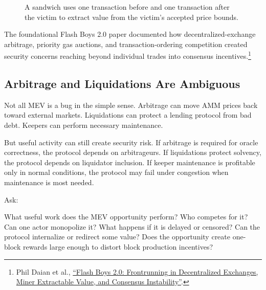 \begin{figure}[htbp]
\centering
{}
\caption{A sandwich uses one transaction before and one transaction after the victim to extract value from the victim's accepted price bounds.}
\end{figure}

The foundational Flash Boys 2.0 paper documented how decentralized-exchange arbitrage, priority gas auctions, and transaction-ordering competition created security concerns reaching beyond individual trades into consensus incentives.\footnote{Phil Daian et al., \href{https://arxiv.org/abs/1904.05234}{``Flash Boys 2.0: Frontrunning in Decentralized Exchanges, Miner Extractable Value, and Consensus Instability''}.}

\subsection{Arbitrage and Liquidations Are Ambiguous}

Not all MEV is a bug in the simple sense. Arbitrage can move AMM prices back toward external markets. Liquidations can protect a lending protocol from bad debt. Keepers can perform necessary maintenance.

But useful activity can still create security risk. If arbitrage is required for oracle correctness, the protocol depends on arbitrageurs. If liquidations protect solvency, the protocol depends on liquidator inclusion. If keeper maintenance is profitable only in normal conditions, the protocol may fail under congestion when maintenance is most needed.

Ask:

\begin{codeblock}
What useful work does the MEV opportunity perform?
Who competes for it?
Can one actor monopolize it?
What happens if it is delayed or censored?
Can the protocol internalize or redirect some value?
Does the opportunity create one-block rewards large enough to distort
block production incentives?
\end{codeblock}

